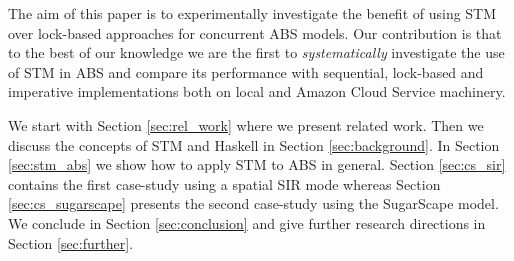 The aim of this paper is to experimentally investigate the benefit of using STM over lock-based approaches for concurrent ABS models. Our contribution is that to the best of our knowledge we are the first to \textit{systematically} investigate the use of STM in ABS and compare its performance with sequential, lock-based and imperative implementations both on local and Amazon Cloud Service machinery.

We start with Section \ref{sec:rel_work} where we present related work. Then we discuss the concepts of STM and Haskell in Section \ref{sec:background}. In Section \ref{sec:stm_abs} we show how to apply STM to ABS in general. Section \ref{sec:cs_sir} contains the first case-study using a spatial SIR mode whereas Section \ref{sec:cs_sugarscape} presents the second case-study using the SugarScape model. We conclude in Section \ref{sec:conclusion} and give further research directions in Section \ref{sec:further}.